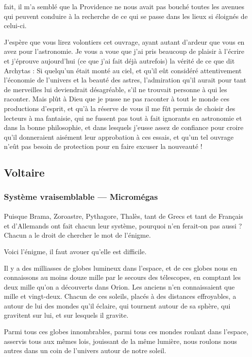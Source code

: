 \documentclass[a4paper, 11pt, oneside]{article}
\begin{document}
fait, il m'a semblé que la Providence ne nous avait pas bouché toutes les avenues qui peuvent conduire à la recherche de ce qui se passe dans les lieux si éloignés de celui-ci.

J'espère que vous lirez volontiers cet ouvrage, ayant autant d'ardeur que vous en avez pour l'astronomie. Je vous a voue que j'ai pris beaucoup de plaisir à l'écrire et j'éprouve aujourd'hui (ce que j'ai fait déjà autrefois) la vérité de ce que dit Archytas : Si quelqu'un était monté au ciel, et qu'il eût considéré attentivement l'économie de l'univers et la beauté des astres, l'admiration qu'il aurait pour tant de merveilles lui deviendrait désagréable, s'il ne trouvait personne à qui les raconter. Mais plût à Dieu que je pusse ne pas raconter à tout le monde ces productions d'esprit, et qu'à la réserve de vous il me fût permis de choisir des lecteurs à ma fantaisie, qui ne fussent pas tout à fait ignorants en astronomie et dans la bonne philosophie, et dans lesquels j'eusse assez de confiance pour croire qu'il donneraient aisément leur approbation à ces essais, et qu'un tel ouvrage n'eût pas besoin de protection pour en faire excuser la nouveauté !
\clearpage
\subsection{Voltaire}
\subsubsection{Système vraisemblable --- Micromégas}
\paragraph{}
Puisque Brama, Zoroastre, Pythagore, Thalès, tant de Grecs et tant de Français et d'Allemands ont fait chacun leur système, pourquoi n'en ferait-on pas aussi ? Chacun a le droit de chercher le mot de l'énigme.

Voici l'énigme, il faut avouer qu'elle est difficile.

Il y a des milliasses de globes lumineux dans l'espace, et de ces globes nous en connaissons au moins douze mille par le secours des télescopes, en comptant les deux mille qu'on a découverts dans Orion. Les anciens n'en connaissaient que mille et vingt-deux. Chacun de ces soleils, placés à des distances effroyables, a autour de lui des mondes qu'il éclaire, qui tournent autour de sa sphère, qui gravitent sur lui, et sur lesquels il gravite.

Parmi tous ces globes innombrables, parmi tous ces mondes roulant dans l'espace, asservis tous aux mêmes lois, jouissant de la même lumière, nous roulons nous autres dans un coin de l'univers autour de notre soleil.
\end{document}
